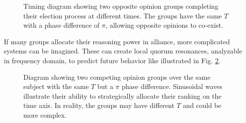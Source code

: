 \documentclass{article}
\begin{document}
\begin{CJK}{UTF8}{gbsn}
\begin{figure}[ht]
        \caption{Timing diagram showing two opposite opinion groups completing their election process at different times. The groups have the same $T$ with a phase difference of $\pi$, allowing opposite opinions to co-exist.}
        \label{fig:processes}
    \end{figure}

    If many groups allocate their reasoning power in alliance, more complicated systems can be imagined. These can create local quorum resonances, analyzable in frequency domain, to predict future behavior like illustrated in Fig. \ref{fig:processes-sinusoidal}.

    \begin{figure}[ht]
        \centering
        \caption{Diagram showing two competing opinion groups over the same subject with the same $T$ but a $\pi$ phase difference. Sinusoidal waves illustrate their ability to strategically allocate their ranking on the time axis. In reality, the groups may have different $T$ and could be more complex.
            \label{fig:processes-sinusoidal}}
    \end{figure}


\end{CJK}
\end{document}

